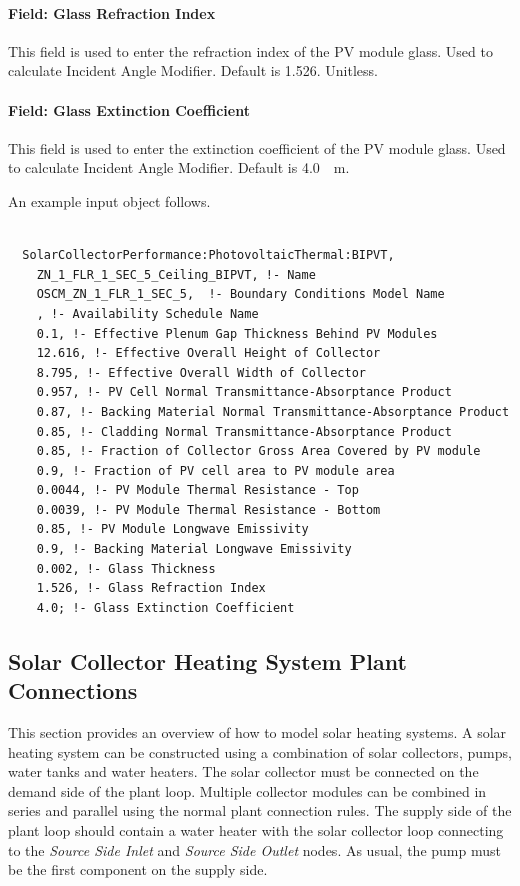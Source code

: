 \paragraph{Field: Glass Refraction Index}\label{BIPVT-field-PVglass-refraction}

This field is used to enter the refraction index of the PV module glass. Used to calculate Incident Angle Modifier. Default is 1.526. Unitless.

\paragraph{Field: Glass Extinction Coefficient}\label{BIPVT-field-PVglass-extinction}

This field is used to enter the extinction coefficient of the PV module glass. Used to calculate Incident Angle Modifier. Default is \SI{4.0}{\per\m}.


An example input object follows.


\begin{lstlisting}

  SolarCollectorPerformance:PhotovoltaicThermal:BIPVT,
    ZN_1_FLR_1_SEC_5_Ceiling_BIPVT, !- Name
    OSCM_ZN_1_FLR_1_SEC_5,  !- Boundary Conditions Model Name
    , !- Availability Schedule Name
    0.1, !- Effective Plenum Gap Thickness Behind PV Modules
    12.616, !- Effective Overall Height of Collector
    8.795, !- Effective Overall Width of Collector
    0.957, !- PV Cell Normal Transmittance-Absorptance Product
    0.87, !- Backing Material Normal Transmittance-Absorptance Product
    0.85, !- Cladding Normal Transmittance-Absorptance Product
    0.85, !- Fraction of Collector Gross Area Covered by PV module
    0.9, !- Fraction of PV cell area to PV module area
    0.0044, !- PV Module Thermal Resistance - Top
    0.0039, !- PV Module Thermal Resistance - Bottom
    0.85, !- PV Module Longwave Emissivity
    0.9, !- Backing Material Longwave Emissivity
    0.002, !- Glass Thickness
    1.526, !- Glass Refraction Index
    4.0; !- Glass Extinction Coefficient

\end{lstlisting}

\subsection{Solar Collector Heating System Plant Connections}\label{solar-collector-heating-system-plant-connections}

This section provides an overview of how to model solar heating systems. A solar heating system can be constructed using a combination of solar collectors, pumps, water tanks and water heaters. The solar collector must be connected on the demand side of the plant loop. Multiple collector modules can be combined in series and parallel using the normal plant connection rules. The supply side of the plant loop should contain a water heater with the solar collector loop connecting to the \emph{Source Side Inlet} and \emph{Source Side Outlet} nodes. As usual, the pump must be the first component on the supply side.

